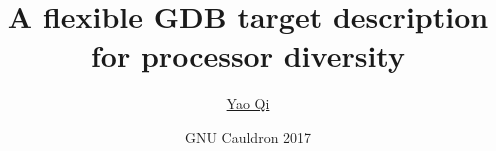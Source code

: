 



\usepackage{array}
\setcounter{rowcount}{0}



\usepackage{tabularx,colortbl}


\usepackage{tikz}
\usetikzlibrary{positioning,arrows,shadows,calc,fit,shapes.geometric}





\title{A flexible GDB target description for processor diversity}

\author{\href{mailto:yao.qi@arm.com}{Yao Qi}}
\date[20170909]{GNU Cauldron 2017}



